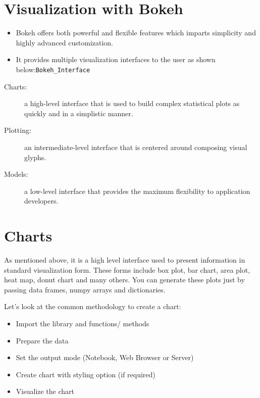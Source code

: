 \documentclass[a4paper,12pt]{article}
\begin{document}
	\Large

 

\section*{Visualization with Bokeh}
\begin{itemize}
\item Bokeh offers both powerful and flexible features which imparts simplicity and highly advanced customization. 



\item It provides multiple visualization interfaces to the user as shown below:\texttt{Bokeh\_Interface}
\end{itemize}



\begin{description}
\item[Charts:] a high-level interface that is used to build complex statistical plots as quickly and in a simplistic manner.
\item[Plotting:] an intermediate-level interface that is centered around composing visual glyphs.
\item[Models:] a low-level interface that provides the maximum flexibility to application developers.
\end{description}
%


\newpage

\section*{Charts}

As mentioned above, it is a high level interface used to present information in standard visualization form. 
These forms include box plot, bar chart, area plot, heat map, donut chart and many others. You can generate these plots just by passing data frames, numpy arrays and dictionaries.

Let’s look at the common methodology to create a chart:

\begin{itemize}
\item Import the library and functions/ methods
\item Prepare the data
\item Set the output mode (Notebook, Web Browser or Server)
\item Create chart with styling option (if required)
\item Visualize the chart
\end{itemize}
\end{document}
